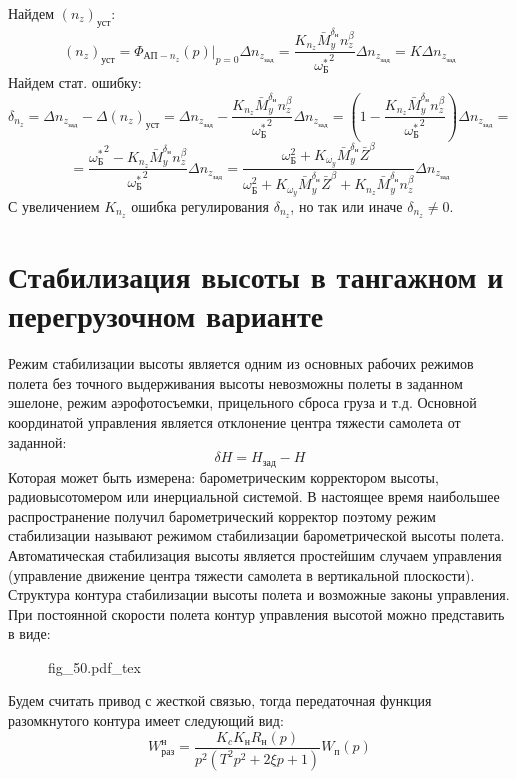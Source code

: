 \documentclass{article}
\newcommand{\incfig}[1]{
    {#1.pdf_tex}
}
\begin{document}
Найдем $(n_z)_\text{уст}$:
\[
    (n_z)_\text{уст} = \Phi_{\text{АП}-n_z}(p) |_{p=0} \Delta n_{z_\text{зад}}
    =\frac{K_{n_z} \bar{M}_y^{\delta_\text{н}}
    n_z^\beta}{{\omega_\text{Б}^*}^2} \Delta n_{z_\text{зад}} = K \Delta
    n_{z_\text{зад}}
\]
Найдем стат. ошибку:
\[
    \delta_{n_z} = \Delta n_{z_\text{зад}} - \Delta (n_z)_\text{уст} = \Delta
    n_{z_\text{зад}} - \frac{K_{n_z}
    \bar{M}_y^{\delta_\text{н}}n_z^\beta}{{\omega_\text{Б}^*}^2} \Delta
    n_{z_\text{зад}} = \left( 1 - \frac{ K_{n_z} \bar{M}_y^{\delta_\text{н}}
    n_z^\beta}{{\omega_\text{Б}^*}^2} \right) \Delta n_{z_\text{зад}} =
\]
\[
    = \frac{{\omega_\text{Б}^*}^2 - K_{n_z} \bar{M}_y^{\delta_\text{н}}
    n_z^\beta}{ {\omega_\text{Б}^*}^2} \Delta n_{z_\text{зад}} =
    \frac{\omega_\text{Б}^2 + K_{\omega_y} \bar{M}_y^{\delta_\text{н}}
    \bar{Z}^\beta}{\omega_\text{Б}^2 + K_{\omega_y} \bar{M}_y^{\delta_\text{н}}
\bar{Z}^\beta + K_{n_z} \bar{M}_y^{\delta_\text{н}} n_z^\beta} \Delta
n_{z_\text{зад}}
\]
С увеличением $K_{n_z}$ ошибка регулирования $\delta_{n_z}$, но так или иначе
$\delta_{n_z} \neq 0$.

\section{Стабилизация высоты в тангажном и перегрузочном варианте}
Режим стабилизации высоты является одним из основных рабочих режимов полета без
точного выдерживания высоты невозможны полеты в заданном эшелоне, режим
аэрофотосъемки, прицельного сброса груза и т.д. Основной координатой управления
является отклонение центра тяжести самолета от заданной:
\[
    \delta H = H_\text{зад} - H
\]
Которая может быть измерена: барометрическим корректором высоты,
радиовысотомером или инерциальной системой. В настоящее время наибольшее
распространение получил барометрический корректор поэтому режим стабилизации
называют режимом стабилизации барометрической высоты полета. Автоматическая
стабилизация высоты является простейшим случаем управления (управление движение
центра тяжести самолета в вертикальной плоскости). Структура контура
стабилизации высоты полета и возможные законы управления. При постоянной
скорости полета контур управления высотой можно представить в виде:

\begin{figure}[H]
    \centering
    \incfig{fig_50}
    \label{fig:fig_50}
\end{figure}

Будем считать привод с жесткой связью, тогда передаточная функция разомкнутого
контура имеет следующий вид:
\[
    W_\text{раз}^\text{н} =\frac{K_c K_\text{н} R_\text{н}(p)}{p^2(T^2 p^2 + 2
    \xi p + 1)}W_\text{п}(p)
\]
\end{document}
